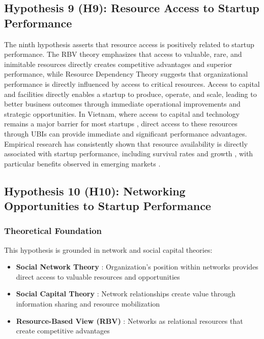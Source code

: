 \documentclass[../Main.tex]{subfiles}
\begin{document}
    \subsection{Hypothesis 9 (H9): Resource Access to Startup Performance}
    The ninth hypothesis asserts that resource access is positively related to startup performance. The RBV theory \autocite{barney1991firm} emphasizes that access to valuable, rare, and inimitable resources directly creates competitive advantages and superior performance, while Resource Dependency Theory \autocite{pfeffer1978external} suggests that organizational performance is directly influenced by access to critical resources. Access to capital and facilities directly enables a startup to produce, operate, and scale, leading to better business outcomes through immediate operational improvements and strategic opportunities. In Vietnam, where access to capital and technology remains a major barrier for most startups \autocite{vietnam_innovation_report_2024}, direct access to these resources through UBIs can provide immediate and significant performance advantages. Empirical research has consistently shown that resource availability is directly associated with startup performance, including survival rates and growth \autocite{cooper1994initial}, with particular benefits observed in emerging markets \autocite{bruton2010governance}.

    \subsection{Hypothesis 10 (H10): Networking Opportunities to Startup Performance}

    \subsubsection{Theoretical Foundation}
    This hypothesis is grounded in network and social capital theories:

    \begin{itemize}
        \item \textbf{Social Network Theory} \autocite{granovetter1973strength}: Organization's position within networks provides direct access to valuable resources and opportunities
        \item \textbf{Social Capital Theory} \autocite{coleman1988social}: Network relationships create value through information sharing and resource mobilization
        \item \textbf{Resource-Based View (RBV)} \autocite{barney1991firm}: Networks as relational resources that create competitive advantages
    \end{itemize}
\end{document}
